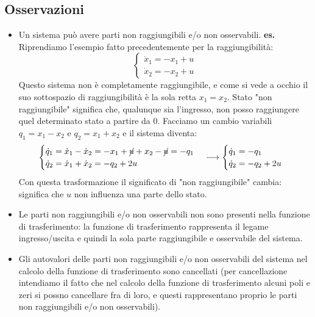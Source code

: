 \subsection{Osservazioni}
\begin{itemize}
    \item Un sistema può avere parti non raggiungibili e/o non osservabili.\newline
    \newline
    \textbf{es.} Riprendiamo l'esempio fatto precedentemente per la raggiungibilità: \[\begin{cases}
            \dot{x}_1 = -x_1 +u\\
            \dot{x}_2 = -x_2 +u
        \end{cases}
        \] 
        Questo sistema non è completamente raggiungibile, e come si vede a occhio il suo sottospazio di raggiungibilità è la sola retta $x_1 = x_2$. Stato "non raggiungibile" significa che, qualunque sia l'ingresso, non posso raggiungere quel determinato stato a partire da $0$.\newline
        Facciamo un cambio variabili $q_1 = x_1 - x_2$ e $q_2 = x_1 + x_2$ e il sistema diventa: \[
            \begin{cases}
                \dot{q}_1 = \dot{x}_1 - \dot{x}_2 = - x_1 + \cancel{u} + x_2 - \cancel{u} = - q_1\\
                \dot{q}_2 = \dot{x}_1 + \dot{x}_2 = - q_2 + 2 u
            \end{cases} \longrightarrow \begin{cases}
                \dot{q}_1 = -q_1\\
                \dot{q}_2 = -q_2 + 2u
            \end{cases}
        \]
        Con questa trasformazione il significato di "non raggiungibile" cambia: significa che $u$ non influenza una parte dello stato.
        \item Le parti non raggiungibili e/o non osservabili non sono presenti nella funzione di trasferimento: la funzione di trasferimento rappresenta il legame ingresso/uscita e quindi la sola parte raggiungibile e osservabile del sistema.
        \item Gli autovalori delle parti non raggiungibili e/o non osservabili del sistema nel calcolo della funzione di trasferimento sono cancellati (per cancellazione intendiamo il fatto che nel calcolo della funzione di trasferimento alcuni poli e zeri si possno cancellare fra di loro, e questi rappresentano proprio le parti non raggiungibili e/o non osservabili).
\end{itemize}
